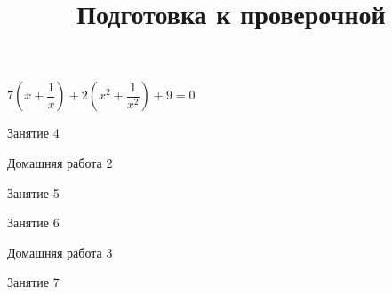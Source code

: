 \begin{class}[number=3]
	\begin{listofex}
		\item \( 7\left( x+\dfrac{1}{x} \right)+2\left( x^2+\dfrac{1}{x^2} \right)+9=0 \)
	\end{listofex}
\end{class}

\begin{class}[number=4]
	\begin{listofex}
		\item Занятие 4
	\end{listofex}
\end{class}

\begin{homework}[number=2]
	\begin{listofex}
		\item Домашняя работа 2
	\end{listofex}
\end{homework}

\begin{class}[number=5]
	\begin{listofex}
		\item Занятие 5
	\end{listofex}
\end{class}

\begin{class}[number=6]
	\begin{listofex}
		\item Занятие 6
	\end{listofex}
\end{class}

\begin{homework}[number=3]
	\begin{listofex}
		\item Домашняя работа 3
	\end{listofex}
\end{homework}

\begin{class}[number=7]
	\title{Подготовка к проверочной}
	\begin{listofex}
		\item Занятие 7
	\end{listofex}
\end{class}

